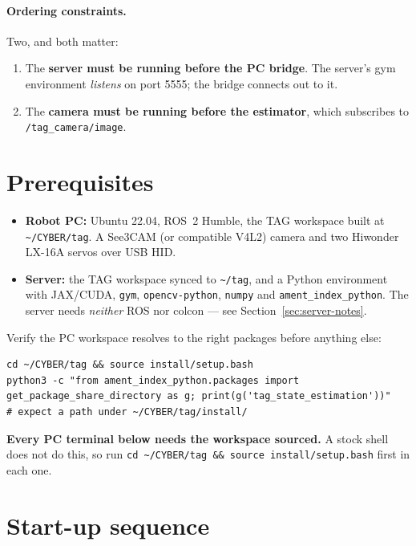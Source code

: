 \documentclass[11pt,a4paper]{article}
\newcommand{\cmd}[1]{\texttt{\small #1}}
\newcommand{\file}[1]{\texttt{\small #1}}
\newcommand{\topicname}[1]{\texttt{\small #1}}
\begin{document}
\paragraph{Ordering constraints.} Two, and both matter:
\begin{enumerate}[nosep,left=6mm]
  \item The \textbf{server must be running before the PC bridge}. The server's
        gym environment \emph{listens} on port 5555; the bridge connects out to
        it.
  \item The \textbf{camera must be running before the estimator}, which
        subscribes to \topicname{/tag\_camera/image}.
\end{enumerate}

\section{Prerequisites}

\begin{itemize}[nosep,left=6mm]
  \item \textbf{Robot PC:} Ubuntu 22.04, ROS~2 Humble, the TAG workspace built at
        \file{\~{}/CYBER/tag}. A See3CAM (or compatible V4L2) camera and two
        Hiwonder LX-16A servos over USB HID.
  \item \textbf{Server:} the TAG workspace synced to \file{\~{}/tag}, and a Python
        environment with JAX/CUDA, \cmd{gym}, \cmd{opencv-python},
        \cmd{numpy} and \cmd{ament\_index\_python}. The server needs
        \emph{neither} ROS nor colcon --- see Section~\ref{sec:server-notes}.
\end{itemize}

Verify the PC workspace resolves to the right packages before anything else:

\begin{lstlisting}
cd ~/CYBER/tag && source install/setup.bash
python3 -c "from ament_index_python.packages import get_package_share_directory as g; print(g('tag_state_estimation'))"
# expect a path under ~/CYBER/tag/install/
\end{lstlisting}

\textbf{Every PC terminal below needs the workspace sourced.} A stock shell does
not do this, so run \cmd{cd \~{}/CYBER/tag \&\& source install/setup.bash} first
in each one.

\section{Start-up sequence}
\label{sec:startup}
\end{document}
